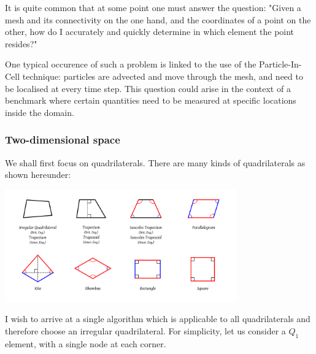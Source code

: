
It is quite common that at some point one must answer the question:
"Given a mesh and its connectivity on the one hand, and the coordinates of a 
point on the other, how do I accurately and quickly determine in which element 
the point resides?"

One typical occurence of such a problem is linked to the use of the Particle-In-Cell 
technique: particles are advected and move through the mesh, and need to be localised 
at every time step. This question could arise in the context of a benchmark where 
certain quantities need to be measured at specific locations inside the domain. 

\subsubsection{Two-dimensional space}

We shall first focus on quadrilaterals. There are many kinds of quadrilaterals as shown 
hereunder: 

\begin{center}
\includegraphics[width=10cm]{images/quadrilaterals} %
\end{center}

I wish to arrive at a single algorithm which is applicable to all quadrilaterals and therefore 
choose an irregular quadrilateral. For simplicity, let us consider a $Q_1$ element, with a single
node at each corner. 

\begin{center}
\\
\end{center}

